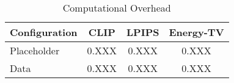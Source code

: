 
\begin{table}[H]
\centering
\caption{Computational Overhead}
\label{tab:table6_overhead}
\begin{tabular}{lccc}
\toprule
Configuration & CLIP & LPIPS & Energy-TV \\
\midrule
Placeholder & 0.XXX & 0.XXX & 0.XXX \\
Data & 0.XXX & 0.XXX & 0.XXX \\
\bottomrule
\end{tabular}
\end{table}
